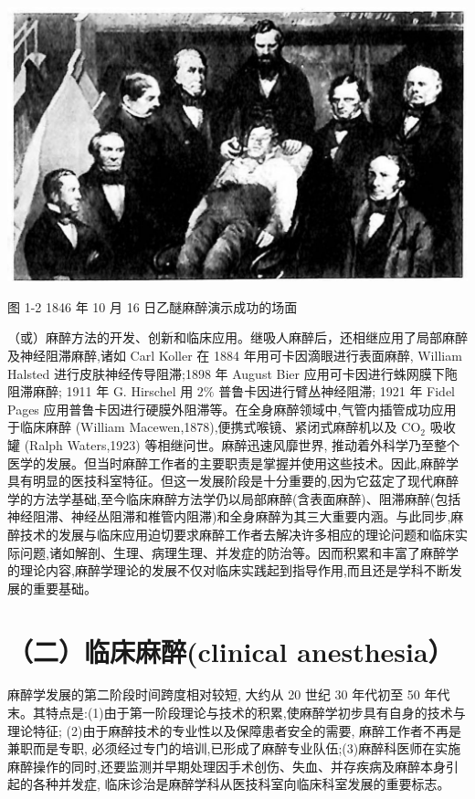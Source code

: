 \documentclass[10pt]{article}
\begin{document}
\begin{center}
\includegraphics[max width=\textwidth]{2024_07_09_002a177993bd97d1d6d7g-027}
\end{center}

图 1-2 1846 年 10 月 16 日乙醚麻醉演示成功的场面

（或）麻醉方法的开发、创新和临床应用。继吸人麻醉后，还相继应用了局部麻醉及神经阻滞麻醉,诸如 Carl Koller 在 1884 年用可卡因滴眼进行表面麻醉, William Halsted 进行皮肤神经传导阻滞;1898 年 August Bier 应用可卡因进行蛛网膜下陁阻滞麻醉; 1911 年 G. Hirschel 用 $2 \%$ 普鲁卡因进行臂丛神经阻滞; 1921 年 Fidel Pages 应用普鲁卡因进行硬膜外阻滞等。在全身麻醉领域中,气管内插管成功应用于临床麻醉 (William Macewen,1878),便携式喉镜、紧闭式麻醉机以及 $\mathrm{CO}_{2}$ 吸收罐 (Ralph Waters,1923) 等相继问世。麻醉迅速风靡世界, 推动着外科学乃至整个医学的发展。但当时麻醉工作者的主要职责是掌握并使用这些技术。因此,麻醉学具有明显的医技科室特征。但这一发展阶段是十分重要的,因为它茲定了现代麻醉学的方法学基础,至今临床麻醉方法学仍以局部麻醉(含表面麻醉)、阻滞麻醉(包括神经阻滞、神经丛阻滞和椎管内阻滞)和全身麻醉为其三大重要内涵。与此同步,麻醉技术的发展与临床应用迫切要求麻醉工作者去解决许多相应的理论问题和临床实际问题,诸如解剖、生理、病理生理、并发症的防治等。因而积累和丰富了麻醉学的理论内容,麻醉学理论的发展不仅对临床实践起到指导作用,而且还是学科不断发展的重要基础。

\section*{（二）临床麻醉(clinical anesthesia）}
麻醉学发展的第二阶段时间跨度相对较短, 大约从 20 世纪 30 年代初至 50 年代末。其特点是:(1)由于第一阶段理论与技术的积累,使麻醉学初步具有自身的技术与理论特征; (2)由于麻醉技术的专业性以及保障患者安全的需要, 麻醉工作者不再是兼职而是专职, 必须经过专门的培训,已形成了麻醉专业队伍;(3)麻醉科医师在实施麻醉操作的同时,还要监测并早期处理因手术创伤、失血、并存疾病及麻醉本身引起的各种并发症, 临床诊治是麻醉学科从医技科室向临床科室发展的重要标志。
\end{document}
